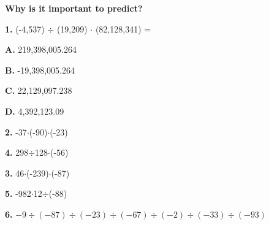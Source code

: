 \documentclass{article}
\begin{document}
\begin{center}
	{\textbf{Why is it important to predict?}}
\end{center}
\hop

\begin{description}
\item{\textbf{1. }}(-4,537) $\div$ (19,209) $\cdot$ (82,128,341) = \hfill\answerbox
\item{\textbf{A. }} 219,398,005.264
\item{\textbf{B. }} -19,398,005.264
\item{\textbf{C. }} 22,129,097.238
\item{\textbf{D. }} 4,392,123.09
\end{description}

\jump

\begin{minipage}[t]{0.5\textwidth}
	\begin{description}
	\item{\textbf{2. }} -37$\cdot$(-90)$\cdot$(-23)
	\jump
	\item{\textbf{4. }} 298$\div$128$\cdot$(-56)
	\jump
	\end{description}
\end{minipage}
\begin{minipage}[t]{0.5\textwidth}
	\begin{description}
	\item{\textbf{3. }} 46$\cdot$(-239)$\cdot$(-87)
	\jump
	\item{\textbf{5. }} -982$\cdot$12$\div$(-88)
	\jump
	\end{description}
\end{minipage}

\begin{description}
\item{\textbf{6. }} $-9\div(-87)\div(-23)\div(-67)\div(-2)\div(-33)\div(-93)$ 

\end{description}	
\pagebreak


			
\end{document}
